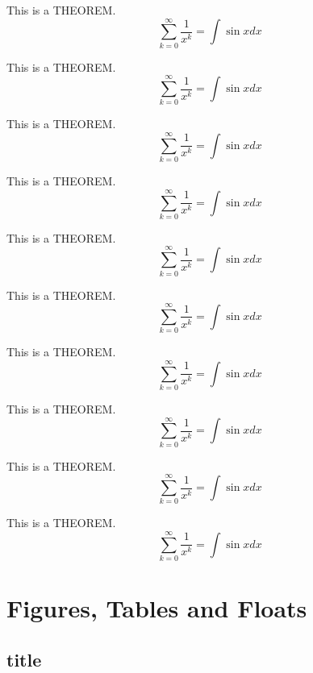 \documentclass[twoside]{fduthesis-en}
\begin{document}
\begin{cb}
This is a THEOREM.
\[ \sum_{k=0}^{\infty} \frac{1}{x^k} = \int \sin x dx \]
\end{cb}


\begin{np}
This is a THEOREM.
\[ \sum_{k=0}^{\infty} \frac{1}{x^k} = \int \sin x dx \]
\end{np}

\begin{nmm}
This is a THEOREM.
\[ \sum_{k=0}^{\infty} \frac{1}{x^k} = \int \sin x dx \]
\end{nmm}

\begin{nfduc}
This is a THEOREM.
\[ \sum_{k=0}^{\infty} \frac{1}{x^k} = \int \sin x dx \]
\end{nfduc}

\begin{nfdub}
This is a THEOREM.
\[ \sum_{k=0}^{\infty} \frac{1}{x^k} = \int \sin x dx \]
\end{nfdub}

\begin{nmb}
This is a THEOREM.
\[ \sum_{k=0}^{\infty} \frac{1}{x^k} = \int \sin x dx \]
\end{nmb}

\begin{ncb}
This is a THEOREM.
\[ \sum_{k=0}^{\infty} \frac{1}{x^k} = \int \sin x dx \]
\end{ncb}

\begin{ncb}
This is a THEOREM.
\[ \sum_{k=0}^{\infty} \frac{1}{x^k} = \int \sin x dx \]
\end{ncb}

\begin{ncb}
This is a THEOREM.
\[ \sum_{k=0}^{\infty} \frac{1}{x^k} = \int \sin x dx \]
\end{ncb}

\begin{ncb}
This is a THEOREM.
\[ \sum_{k=0}^{\infty} \frac{1}{x^k} = \int \sin x dx \]
\end{ncb}

\chapter{Figures, Tables and Floats}

\section{title}
\end{document}
